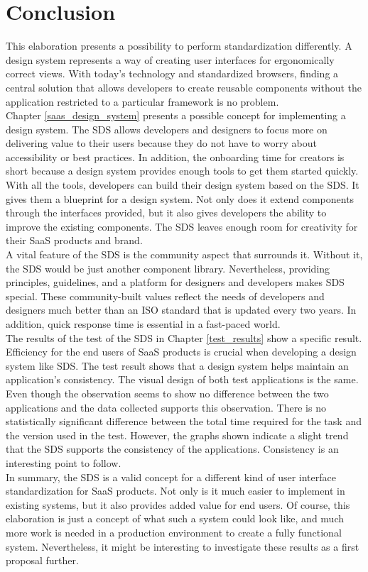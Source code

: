 \newpage
\section{Conclusion}
This elaboration presents a possibility to perform standardization differently. A design system represents a way of creating user interfaces for ergonomically correct views. With today's technology and standardized browsers, finding a central solution that allows developers to create reusable components without the application restricted to a particular framework is no problem.  \\
Chapter \ref{saas_design_system} presents a possible concept for implementing a design system. The \acl{SDS} allows developers and designers to focus more on delivering value to their users because they do not have to worry about accessibility or best practices. In addition, the onboarding time for creators is short because a design system provides enough tools to get them started quickly. \\
With all the tools, developers can build their design system based on the \ac{SDS}. It gives them a blueprint for a design system. Not only does it extend components through the interfaces provided, but it also gives developers the ability to improve the existing components. The \ac{SDS} leaves enough room for creativity for their \ac{SaaS} products and brand.\\
A vital feature of the \ac{SDS} is the community aspect that surrounds it. Without it, the \ac{SDS} would be just another component library. Nevertheless, providing principles, guidelines, and a platform for designers and developers makes \ac{SDS} special. These community-built values reflect the needs of developers and designers much better than an ISO standard that is updated every two years. In addition, quick response time is essential in a fast-paced world. \\
The results of the test of the \ac{SDS} in Chapter \ref{test_results} show a specific result. Efficiency for the end users of SaaS products is crucial when developing a design system like SDS. The test result shows that a design system helps maintain an application's consistency. The visual design of both test applications is the same. Even though the observation seems to show no difference between the two applications and the data collected supports this observation. There is no statistically significant difference between the total time required for the task and the version used in the test. However, the graphs shown indicate a slight trend that the \ac{SDS} supports the consistency of the applications. Consistency is an interesting point to follow. \\
In summary, the \ac{SDS} is a valid concept for a different kind of user interface standardization for \ac{SaaS} products. Not only is it much easier to implement in existing systems, but it also provides added value for end users. Of course, this elaboration is just a concept of what such a system could look like, and much more work is needed in a production environment to create a fully functional system. Nevertheless, it might be interesting to investigate these results as a first proposal further. 
